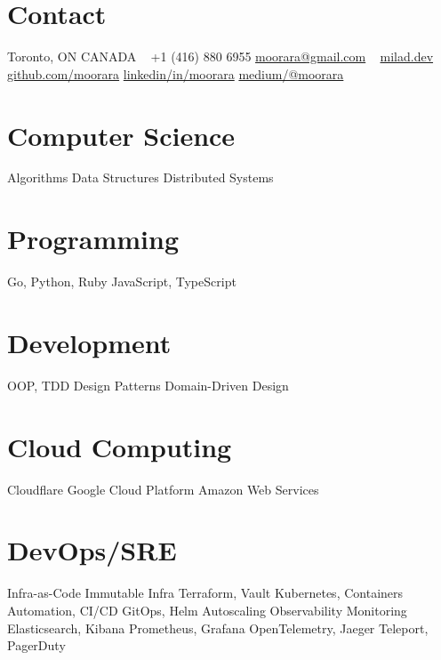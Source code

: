 \documentclass[]{cv-style}                     %
\begin{document}
\lastupdated



\begin{aside}
%
\section{Contact}
Toronto, ON  CANADA
~
+1 (416) 880 6955
\href{mailto:moorara@gmail.com}{moorara@gmail.com}
~
\href{https://milad.dev}{milad.dev}
\href{https://github.com/moorara}{github.com/moorara}
\href{https://linkedin.com/in/moorara}{linkedin/in/moorara}
\href{https://medium.com/@moorara}{medium/@moorara}
%
\section{Computer Science}
Algorithms
Data Structures
Distributed Systems
%
\section{Programming}
Go, Python, Ruby
JavaScript, TypeScript
%
\section{Development}
OOP, TDD
Design Patterns
Domain-Driven Design
%
%
\section{Cloud Computing}
Cloudflare
Google Cloud Platform
Amazon Web Services
%
\section{DevOps/SRE}
Infra-as-Code
Immutable Infra
Terraform, Vault
Kubernetes, Containers
Automation, CI/CD
GitOps, Helm
Autoscaling
Observability
Monitoring
Elasticsearch, Kibana
Prometheus, Grafana
OpenTelemetry, Jaeger
Teleport, PagerDuty
%

\end{aside}
\end{document}
